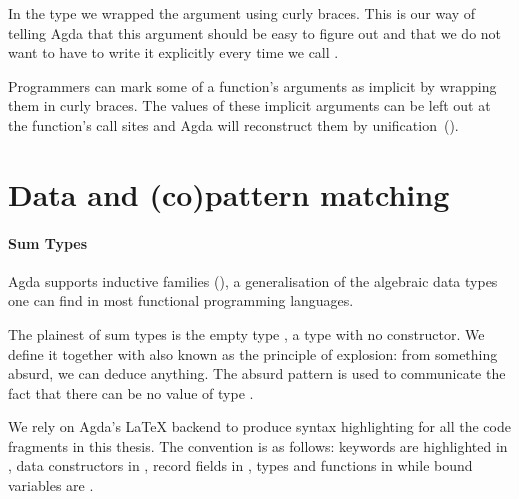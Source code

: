 In the type  we wrapped the  argument using curly braces.
This is our way of telling Agda that this argument should be easy to figure
out and that we do not want to have to write it explicitly every time we
call .

\begin{feature}
Programmers can mark some of a function's arguments as implicit by
wrapping them in curly braces. The values of these implicit arguments
can be left out at the function's call sites and Agda will reconstruct
them by unification~(\cite{DBLP:conf/tlca/AbelP11}).
\end{feature}

\section{Data and (co)pattern matching}

\paragraph{Sum Types} Agda supports inductive families
(\cite{dybjer1991inductive}), a generalisation of the algebraic data types
one can find in most functional programming languages.

The plainest of sum types is the empty type , a type with no constructor.
We define it together with  also known as the principle of explosion:
from something absurd, we can deduce anything. The absurd pattern \AS{()} is
used to communicate the fact that there can be no value of type .

\begin{minipage}[t]{0.5\textwidth}
\end{minipage}\begin{minipage}[t]{0.5\textwidth}
\end{minipage}

\begin{feature} We rely on Agda's \LaTeX{} backend to produce
syntax highlighting for all the code fragments in this thesis. The convention
is as follows: keywords are highlighted in , data constructors in
, record fields in , types and functions in 
while bound variables are .
\end{feature}

